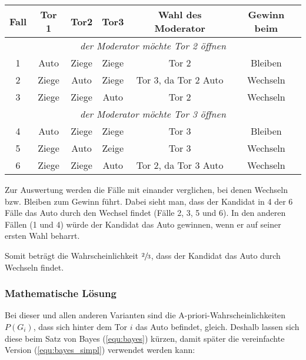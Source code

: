 \begin{tabular}[h]{|c|c|c|c|c|c|}
    \hline
    \textbf{Fall} & \textbf{Tor 1} & \textbf{Tor2} & \textbf{Tor3} & \textbf{Wahl des Moderator} & \textbf{Gewinn beim} \\
    \hline
    \multicolumn{6}{|c|}{\textit{der Moderator möchte Tor 2 öffnen} }                                                   \\
    \hline
    1             & Auto           & Ziege         & Ziege         & Tor 2                       & Bleiben              \\
    2             & Ziege          & Auto          & Ziege         & Tor 3, da Tor 2 Auto        & Wechseln             \\
    3             & Ziege          & Ziege         & Auto          & Tor 2                       & Wechseln             \\
    \hline
    \multicolumn{6}{|c|}{\textit{der Moderator möchte Tor 3 öffnen}
    }                                                                                                                   \\
    \hline
    4             & Auto           & Ziege         & Ziege         & Tor 3                       & Bleiben              \\
    5             & Ziege          & Auto          & Zeige         & Tor 3                       & Wechseln             \\
    6             & Ziege          & Ziege         & Auto          & Tor 2, da Tor 3 Auto        & Wechseln             \\
    \hline
\end{tabular}

Zur Auswertung werden die Fälle mit einander verglichen, bei denen Wechseln bzw. Bleiben zum Gewinn führt.
Dabei sieht man, dass der Kandidat in 4 der 6 Fälle das Auto durch den Wechsel findet (Fälle 2, 3, 5 und 6). In den anderen Fällen (1 und 4) würde der Kandidat das Auto gewinnen, wenn er auf seiner ersten Wahl beharrt.

Somit beträgt die Wahrscheinlichkeit $\sfrac{2}{3}$, dass der Kandidat das Auto durch Wechseln findet.

\subsubsection{Mathematische Lösung}

Bei dieser und allen anderen Varianten sind die A-priori-Wahrscheinlichkeiten $P(G_i)$, dass sich hinter dem Tor $i$ das Auto befindet, gleich. Deshalb lassen sich diese beim Satz von Bayes (\autoref{equ:bayes}) kürzen, damit später die vereinfachte Version (\autoref{equ:bayes_simpl}) verwendet werden kann:

